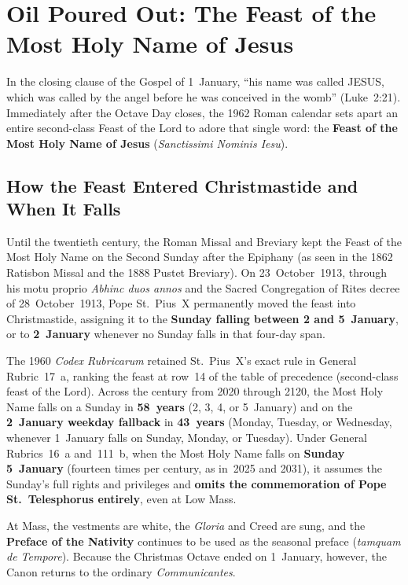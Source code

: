 \section{Oil Poured Out: The Feast of the Most Holy Name of Jesus}\label{sec:holy-name}

In the closing clause of the Gospel of 1~January, ``his name was called JESUS,
which was called by the angel before he was conceived in the womb''
(Luke~2:21). Immediately after the Octave Day closes, the 1962 Roman calendar
sets apart an entire second-class Feast of the Lord to adore that single word:
the \textbf{Feast of the Most Holy Name of Jesus} (\textit{Sanctissimi Nominis
Iesu}).

\subsection{How the Feast Entered Christmastide and When It Falls}

Until the twentieth century, the Roman Missal and Breviary kept the Feast of
the Most Holy Name on the Second Sunday after the Epiphany (as seen in the 1862
Ratisbon Missal and the 1888 Pustet Breviary). On 23~October~1913, through his
motu proprio \textit{Abhinc duos annos} and the Sacred Congregation of Rites
decree of 28~October~1913, Pope St.~Pius~X permanently moved the feast into
Christmastide, assigning it to the \textbf{Sunday falling between 2 and
5~January}, or to \textbf{2~January} whenever no Sunday falls in that four-day
span.

The 1960 \textit{Codex Rubricarum} retained St.~Pius~X's exact rule in General
Rubric~17~a, ranking the feast at row~14 of the table of precedence (second-class
feast of the Lord). Across the century from 2020 through 2120, the Most Holy
Name falls on a Sunday in \textbf{58~years} (2, 3, 4, or 5~January) and on the
\textbf{2~January weekday fallback} in \textbf{43~years} (Monday, Tuesday, or
Wednesday, whenever 1~January falls on Sunday, Monday, or Tuesday). Under General Rubrics~16~a and~111~b, when the Most Holy Name
falls on \textbf{Sunday 5~January} (fourteen times per century, as in~2025 and
2031), it assumes the Sunday's full rights and privileges and \textbf{omits the
commemoration of Pope St.~Telesphorus entirely}, even at Low Mass.

At Mass, the vestments are white, the \textit{Gloria} and Creed are sung, and
the \textbf{Preface of the Nativity} continues to be used as the seasonal
preface (\textit{tamquam de Tempore}). Because the Christmas Octave ended on
1~January, however, the Canon returns to the ordinary \textit{Communicantes}.

